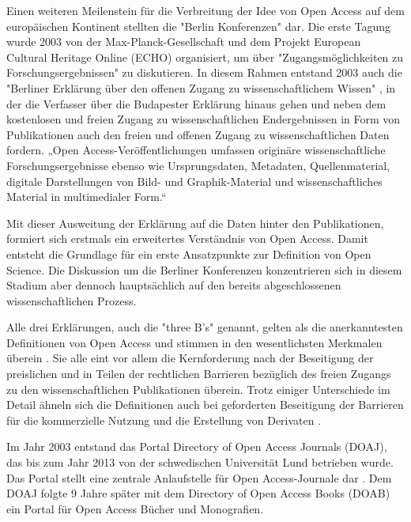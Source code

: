 \begin{enumerate}
Einen weiteren Meilenstein für die Verbreitung der Idee von Open Access auf dem europäischen Kontinent stellten die "Berlin Konferenzen"\cite{CREATe_2014} dar. Die erste Tagung wurde 2003 von der Max-Planck-Gesellschaft und dem Projekt European Cultural Heritage Online (ECHO) organisiert, um über "Zugangsmöglichkeiten zu Forschungsergebnissen" zu diskutieren. In diesem Rahmen entstand 2003 auch die "Berliner Erklärung über den offenen Zugang zu wissenschaftlichem Wissen" \cite{berliner_erklaerung_2003}, in der die Verfasser über die Budapester Erklärung hinaus gehen und neben dem kostenlosen und freien Zugang zu wissenschaftlichen Endergebnissen in Form von Publikationen auch den freien und offenen Zugang zu wissenschaftlichen Daten fordern. „Open Access-Veröffentlichungen umfassen originäre wissenschaftliche Forschungsergebnisse ebenso wie Ursprungsdaten, Metadaten, Quellenmaterial, digitale Darstellungen von Bild- und Graphik-Material und wissenschaftliches Material in multimedialer Form.“ \cite{berliner_erklaerung_2003}

Mit dieser Ausweitung der Erklärung auf die Daten hinter den Publikationen, formiert sich erstmals ein erweitertes Verständnis von Open Access. Damit entsteht die Grundlage für ein erste Ansatzpunkte zur Definition von Open Science. Die Diskussion um die Berliner Konferenzen konzentrieren sich in diesem Stadium aber dennoch hauptsächlich auf den bereits abgeschlossenen wissenschaftlichen Prozess.
\end{enumerate}

Alle drei Erklärungen, auch die "three B's" \cite{suber_2004_praising_oa} genannt, gelten als die anerkanntesten Definitionen von Open Access und stimmen in den wesentlichsten Merkmalen überein \cite{albert_2006_open_implications}. Sie alle eint vor allem die Kernforderung nach der Beseitigung der preislichen und in Teilen der rechtlichen Barrieren bezüglich des freien Zugangs zu den wissenschaftlichen Publikationen überein. Trotz einiger Unterschiede im Detail ähneln sich die Definitionen auch bei geforderten Beseitigung der Barrieren für die kommerzielle Nutzung und die Erstellung von Derivaten \cite{CREATe_2014}.

Im Jahr 2003 entstand das Portal Directory of Open Access Journals (DOAJ), das bis zum Jahr 2013 von der schwedischen Universität Lund betrieben wurde. Das Portal stellt eine zentrale Anlaufstelle für Open Access-Journale dar \cite{suchen-Hoffmann-Zugang-undVerwertung-oeffentlicher-Informationen}. Dem DOAJ folgte 9 Jahre später mit dem Directory of Open Access Books (DOAB) ein Portal für Open Access Bücher und Monografien.

